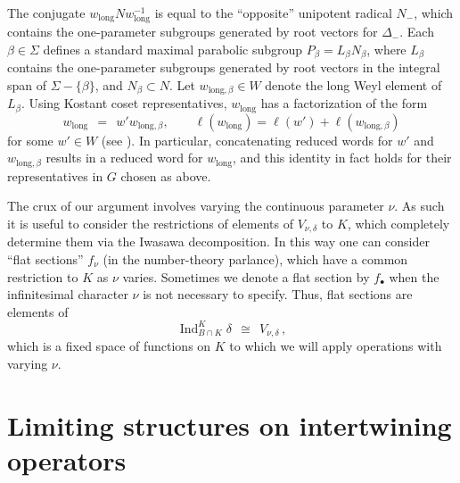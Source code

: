 \documentclass[12pt]{article}
\numberwithin{equation}{section}
\renewcommand\d{\delta}
\renewcommand\({\left(}
\renewcommand\){\right)}
\begin{document}
The conjugate $w_{\text{long}}Nw_{\text{long}}^{-1}$ is equal to the ``opposite'' unipotent radical $N_{-}$, which  contains the one-parameter subgroups generated by root vectors for $\Delta_{-}$.  Each $\beta\in\Sigma$ defines a standard maximal parabolic subgroup $P_\beta=L_\beta N_\beta$, where $L_\beta$ contains the one-parameter subgroups generated by root vectors in  the integral span of $\Sigma -\{\beta\}$, and $N_\beta\subset N$. Let $w_{\text{long},\beta} \in W$ denote the long Weyl element of $L_\beta$.  Using Kostant coset representatives, $w_{\text{long}}$ has a factorization  of the form
\begin{equation}\label{Kostant}
  w_\text{long} \ \ = \ \ w'w_{\text{long},\beta}, \qquad \ell(w_\text{long})=\ell(w')+\ell(w_{\text{long},\beta})
\end{equation}
for some $w'\in W$
(see \cite[Prop.~1.10(c)]{Humphreys}).  In particular, concatenating reduced words for $w'$ and $w_{\text{long},\beta}$ results in a reduced word for  $w_\text{long}$, and this identity in fact holds for their representatives in $G$ chosen as above.

The crux of our argument involves varying the continuous parameter $\nu$.  As such it is  useful to consider the restrictions of elements of $V_{\nu,\delta}$ to $K$, which completely determine them via the Iwasawa decomposition.  In this way one can consider ``flat sections'' $f_\nu$ (in the number-theory parlance), which have a common restriction to $K$ as $\nu$ varies.  Sometimes we denote a flat section by $f_\bullet$ when the infinitesimal character $\nu$ is not necessary to specify.  Thus, flat sections are elements of
\begin{equation}\label{twoinds}
  \operatorname{Ind}_{B\cap K}^K\delta \ \ \cong  \ \  V_{\nu,\d}\,,
\end{equation}
 which is a fixed space of functions on $K$ to which we will apply operations with varying $\nu$.



\section{Limiting structures on intertwining operators}\label{sec:intertwiners}
\end{document}
